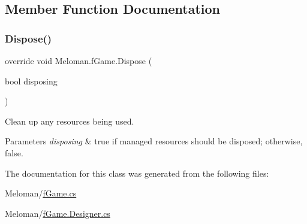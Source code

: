 \subsection{Member Function Documentation}
\mbox{\label{class_meloman_1_1f_game_a66d614ba1a3bbb889dc4c30d54211c30}} 
\subsubsection{\texorpdfstring{Dispose()}{Dispose()}}
{\footnotesize\ttfamily override void Meloman.\+f\+Game.\+Dispose (\begin{DoxyParamCaption}\item[{bool}]{disposing }\end{DoxyParamCaption})\hspace{0.3cm}{\ttfamily [protected]}}



Clean up any resources being used. 


\begin{DoxyParams}{Parameters}
{\em disposing} & true if managed resources should be disposed; otherwise, false.\\
\hline
\end{DoxyParams}


The documentation for this class was generated from the following files\+:\begin{DoxyCompactItemize}
\item 
Meloman/\mbox{\hyperlink{f_game_8cs}{f\+Game.\+cs}}\item 
Meloman/\mbox{\hyperlink{f_game_8_designer_8cs}{f\+Game.\+Designer.\+cs}}\end{DoxyCompactItemize}
